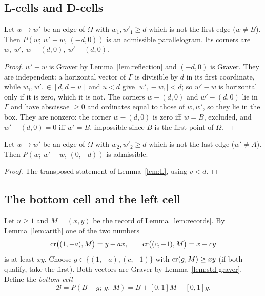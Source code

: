 \subsection{L-cells and D-cells}

\begin{lemma}[L-cells]\label{lem:L}
Let $w\to w'$ be an edge of $\Omega$ with $w_1,w'_1\ge d$ which is not the first edge ($w\ne B$). Then $P(w;\,w'-w,\,(-d,0))$ is an admissible parallelogram. Its corners are $w,\ w',\ w-(d,0),\ w'-(d,0)$.
\end{lemma}
\begin{proof}
$w'-w$ is Graver by Lemma~\ref{lem:reflection} and $(-d,0)$ is Graver. They are independent: a horizontal vector of $\Gamma$ is divisible by $d$ in its first coordinate, while $w_1,w'_1\in[d,d+u]$ and $u<d$ give $|w'_1-w_1|<d$; so $w'-w$ is horizontal only if it is zero, which it is not. The corners $w-(d,0)$ and $w'-(d,0)$ lie in $\Gamma$ and have abscissae $\ge0$ and ordinates equal to those of $w,w'$, so they lie in the box. They are nonzero: the corner $w-(d,0)$ is zero iff $w=B$, excluded, and $w'-(d,0)=0$ iff $w'=B$, impossible since $B$ is the first point of $\Omega$.
\end{proof}

\begin{lemma}[D-cells]\label{lem:D}
Let $w\to w'$ be an edge of $\Omega$ with $w_2,w'_2\ge d$ which is not the last edge ($w'\ne A$). Then $P(w;\,w'-w,\,(0,-d))$ is admissible.
\end{lemma}
\begin{proof}
The transposed statement of Lemma~\ref{lem:L}, using $v<d$.
\end{proof}

\subsection{The bottom cell and the left cell}

Let $u\ge1$ and $M=(x,y)$ be the record of Lemma~\ref{lem:records}. By Lemma~\ref{lem:arith} one of the two numbers
\[
  \operatorname{cr}\bigl((1,-a),M\bigr)=y+ax,\qquad \operatorname{cr}\bigl((c,-1),M\bigr)=x+cy
\]
is at least $xy$. Choose $g\in\{(1,-a),(c,-1)\}$ with $\operatorname{cr}(g,M)\ge xy$ (if both qualify, take the first). Both vectors are Graver by Lemma~\ref{lem:std-graver}. Define the \emph{bottom cell}
\[
  \mathcal B=P(B-g;\ g,\ M)=B+[0,1]M-[0,1]g.
\]

